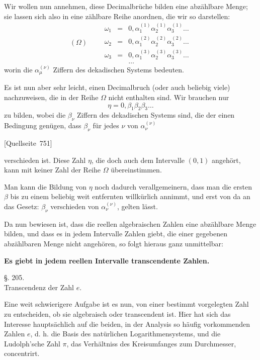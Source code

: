 \documentclass[11pt]{article}
\newcommand{\srcpage}[1]{\par\medskip\noindent\textsf{[Quellseite~#1]}\par\smallskip}
\begin{document}
Wir wollen nun annehmen, diese Decimalbrüche bilden eine abzählbare Menge; sie lassen sich also in eine zählbare Reihe anordnen, die wir so darstellen:
\[
(\Omega)\qquad
\begin{array}{rcl}
\omega_1&=&0,\alpha_1^{(1)}\alpha_2^{(1)}\alpha_3^{(1)}\ldots\\
\omega_2&=&0,\alpha_1^{(2)}\alpha_2^{(2)}\alpha_3^{(2)}\ldots\\
\omega_3&=&0,\alpha_1^{(3)}\alpha_2^{(3)}\alpha_3^{(3)}\ldots\\
&&\ldots
\end{array}
\]
worin die $\alpha_\mu^{(\nu)}$ Ziffern des dekadischen Systems bedeuten.

Es ist nun aber sehr leicht, einen Decimalbruch (oder auch beliebig viele) nachzuweisen, die in der Reihe $\Omega$ nicht enthalten sind. Wir brauchen nur
\[
\eta=0,\beta_1\beta_2\beta_3\ldots
\]
zu bilden, wobei die $\beta_\nu$ Ziffern des dekadischen Systems sind, die der einen Bedingung genügen, dass $\beta_\nu$ für jedes $\nu$ von $\alpha_\nu^{(\nu)}$
\srcpage{751}
verschieden ist. Diese Zahl $\eta$, die doch auch dem Intervalle $(0,1)$ angehört, kann mit keiner Zahl der Reihe $\Omega$ übereinstimmen.

Man kann die Bildung von $\eta$ noch dadurch verallgemeinern, dass man die ersten $\beta$ bis zu einem beliebig weit entfernten willkürlich annimmt, und erst von da an das Gesetz: $\beta_\nu$ verschieden von $\alpha_\nu^{(\nu)}$, gelten lässt.

Da nun bewiesen ist, dass die reellen algebraischen Zahlen eine abzählbare Menge bilden, und dass es in jedem Intervalle Zahlen giebt, die einer gegebenen abzählbaren Menge nicht angehören, so folgt hieraus ganz unmittelbar:

\begin{center}
\textbf{Es giebt in jedem reellen Intervalle transcendente Zahlen.}
\end{center}

\begin{center}
{\large §. 205.}\\[0.4em]
{\large Transcendenz der Zahl $e$.}
\end{center}

Eine weit schwierigere Aufgabe ist es nun, von einer bestimmt vorgelegten Zahl zu entscheiden, ob sie algebraisch oder transcendent ist. Hier hat sich das Interesse hauptsächlich auf die beiden, in der Analysis so häufig vorkommenden Zahlen $e$, d. h. die Basis des natürlichen Logarithmensystems, und die Ludolph'sche Zahl $\pi$, das Verhältniss des Kreisumfanges zum Durchmesser, concentrirt.
\end{document}
